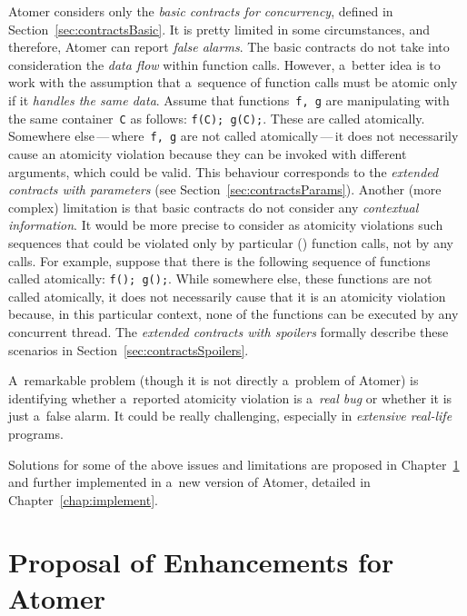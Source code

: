 Atomer considers only the \emph{basic contracts for concurrency}, defined in Section~\ref{sec:contractsBasic}. It is pretty limited in some circumstances, and therefore, Atomer can report \emph{false alarms}. The basic contracts do not take into consideration the \emph{data flow} within function calls. However, a~better idea is to work with the assumption that a~sequence of function calls must be atomic only if it \emph{handles the same data}. Assume that functions~\texttt{f, g} are manipulating with the same container~\texttt{C} as follows: \texttt{f(C); g(C);}. These are called atomically. Somewhere else\,---\,where~\texttt{f, g} are not called atomically\,---\,it does not necessarily cause an atomicity violation because they can be invoked with different arguments, which could be valid. This behaviour corresponds to the \emph{extended contracts with parameters} (see Section~\ref{sec:contractsParams}). Another (more complex) limitation is that basic contracts do not consider any \emph{contextual information}. It would be more precise to consider as atomicity violations such sequences that could be violated only by particular () function calls, not by any calls. For example, suppose that there is the following sequence of functions called atomically: \texttt{f(); g();}. While somewhere else, these functions are not called atomically, it does not necessarily cause that it is an atomicity violation because, in this particular context, none of the  functions can be executed by any concurrent thread. The \emph{extended contracts with spoilers} formally describe these scenarios in Section~\ref{sec:contractsSpoilers}.

A~remarkable problem (though it is not directly a~problem of Atomer) is identifying whether a~reported atomicity violation is a~\emph{real bug} or whether it is just a~false alarm. It could be really challenging, especially in \emph{extensive real-life} programs.

Solutions for some of the above issues and limitations are proposed in Chapter~\ref{chap:proposal} and further implemented in a~new version of Atomer, detailed in Chapter~\ref{chap:implement}.






\chapter{Proposal of Enhancements for Atomer}
\label{chap:proposal}

